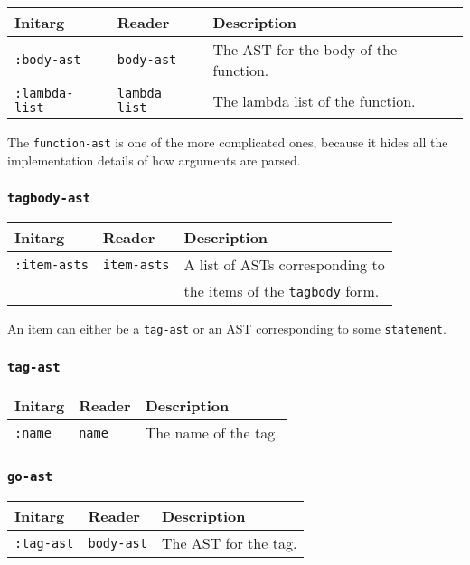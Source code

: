 \begin{tabular}{|l|l|l|}
\hline
Initarg & Reader & Description\\
\hline\hline
\texttt{:body-ast} & \texttt{body-ast} & The AST for the body of the function.\\
\hline
\texttt{:lambda-list} & \texttt{lambda list} & The lambda list of the function.\\
\hline
\end{tabular}

The \texttt{function-ast} is one of the more complicated ones, because
it hides all the implementation details of how arguments are parsed.

\subsubsection{\texttt{tagbody-ast}}
\label{tagbody-ast}

\begin{tabular}{|l|l|l|}
\hline
Initarg & Reader & Description\\
\hline\hline
\texttt{:item-asts} & \texttt{item-asts} & A list of ASTs corresponding to\\
& & the items of the \texttt{tagbody} form. \\
\hline
\end{tabular}

An item can either be a \texttt{tag-ast} or an AST corresponding to
some \texttt{statement}.

\subsubsection{\texttt{tag-ast}}
\label{tag-ast}

\begin{tabular}{|l|l|l|}
\hline
Initarg & Reader & Description\\
\hline\hline
\texttt{:name} & \texttt{name} & The name of the tag.\\
\hline
\end{tabular}

\subsubsection{\texttt{go-ast}}
\label{go-ast}

\begin{tabular}{|l|l|l|}
\hline
Initarg & Reader & Description\\
\hline\hline
\texttt{:tag-ast} & \texttt{body-ast} & The AST for the tag.\\
\hline
\end{tabular}

